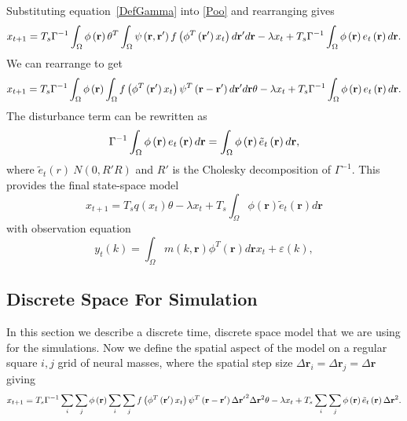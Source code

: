 \documentclass[onecolumn,draftcls]{IEEEtran}
\begin{document}
Substituting equation~\ref{DefGamma} into \ref{Poo} and rearranging gives
\begin{equation}\label{SS Model}
{x_{t+1}} = T_s{\Gamma ^{ - 1}}\int_\Omega  {\phi \left( {\bf{r}} \right)\theta^T\int_\Omega  {\psi \left( {{\bf{r}} , {\bf{r'}}} \right)f\left( {{\phi ^T}\left( {{\bf{r'}}} \right){x_t}} \right)d{\bf{r'}}} d{\bf{r}}} - \lambda x_t + T_s{\Gamma ^{ - 1}}\int_\Omega  {\phi \left( {\bf{r}} \right)e_t\left( {\bf{r}} \right)d{\bf{r}}}.
\end{equation}
We can rearrange to get
\begin{equation}\label{Homogeneous SS Model}
	x_{t+1} = T_s\Gamma ^{ - 1}\int_\Omega  {\phi \left( {\bf{r}} \right)\int_\Omega  {f\left( {{\phi ^T}\left( {{\bf{r'}}} \right){x_t}} \right)\psi^T \left( {{\bf{r}} - {\bf{r'}}} \right)d{\bf{r'}}} d{\bf{r}}}\theta - \lambda x_t + T_s{\Gamma ^{ - 1}}\int_\Omega  {\phi \left( {\bf{r}} \right)e_t\left( {\bf{r}} \right)d{\bf{r}}}.
\end{equation}
The disturbance term can be rewritten as 
\begin{equation}
	\Gamma ^{ - 1}\int_\Omega  {\phi \left( \bf{r} \right)e_t\left( \bf{r} \right)d\bf{r}} = \int_\Omega  {\phi \left( \bf{r} \right)\tilde{e}_t\left( \bf{r} \right)d\bf{r}},
\end{equation}
where $\tilde{e}_t(r)~N(0,R'R)$ and $R'$ is the Cholesky decomposition of $\Gamma^{-1}$. This provides the final state-space model
\begin{equation}\label{AbbrevSSModel}
x_{t + 1} = T_sq(x_t)\theta -\lambda x_t + T_s\int_\Omega  {\phi ( \mathbf{r} )\tilde{e}_t( \mathbf{r} )d\mathbf{r}}
\end{equation}
with observation equation
\begin{equation}\label{ObservationEquation}
    y_t( k ) = \int_\Omega  m( k,\mathbf{r} )\phi^T( \mathbf{r} ) d\mathbf{r}x_t  + \varepsilon ( k ),
\end{equation}

\subsection{Discrete Space For Simulation}

In this section we describe a discrete time, discrete space model that we are using for the simulations. Now we define the spatial aspect of the model on a regular square $i,j$ grid of neural masses, where the spatial step size $\Delta \mathbf{r}_i = \Delta \mathbf{r}_j = \Delta \mathbf{r}$ giving
\begin{equation}\label{DiscreteSpaceModelij}
	x_{t+1} = T_s\Gamma ^{ - 1}\sum_i \sum_j  {\phi \left( \mathbf{r} \right)\sum_i\sum_j  {f\left( \phi^T \left( \mathbf{r'} \right) x_t \right)\psi^T \left( \mathbf{r} - \bf{r'} \right)\Delta\mathbf{r'}^2} \Delta\mathbf{r}^2} \theta - \lambda x_t + T_s\sum_i\sum_j  {\phi \left( {\bf{r}} \right)\tilde{e}_t\left( \bf{r} \right)\Delta\mathbf{r}^2}.
\end{equation}
\end{document}

